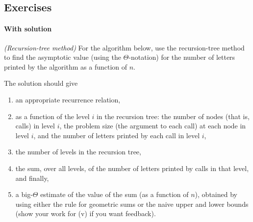 

\subsection{Exercises}

\paragraph{With solution}

\exercise\label{dc: exercise: recursion tree with solution}\emph{(Recursion-tree method)}
For the algorithm below,
use the recursion-tree method to find the asymptotic value (using the $\Theta$-notation)
for the number of letters printed by the algorithm as a function of $n$.

\newcommand{\ALG}[4]{
  \vbox{                        %
    \begin{steps}
    \item[] def \textsf{Print{#1}s}$(n)$:  \comment{Assume $n$ is a power of $#4$.}
      \step for $i = 1$ to $#2$: print(``{#1}'') \comment{\ldots print $#2$ #1's}
      \step if $n > 1$:
      \step~~~for $j=1$ to $#3$: \textsf{Print{#1}s}$(\floor{n/#4})$
      \comment{\ldots make $#3$ recursive calls, each with input $\floor{n/#4}$}
    \end{steps}
  }
}


\newpage

The solution should give
\begin{enumerate}[label=(\roman*)]
\item an appropriate recurrence relation,  
\item as a function of the level $i$ in the recursion tree:
the number of nodes (that is, calls) in level $i$,
the problem size (the argument to each call) at each node in level $i$,
and the number of letters printed by each call in level $i$,
\item the number of levels in the recursion tree,
\item the sum, over all levels, of the number of letters printed by calls in that level,
  and finally,
\item a big-$\Theta$ estimate of the value of the sum
(as a function of $n$), obtained by using either the rule for geometric
sums or the naive upper and lower bounds
(show your work for (v) if you want feedback).
\end{enumerate}

